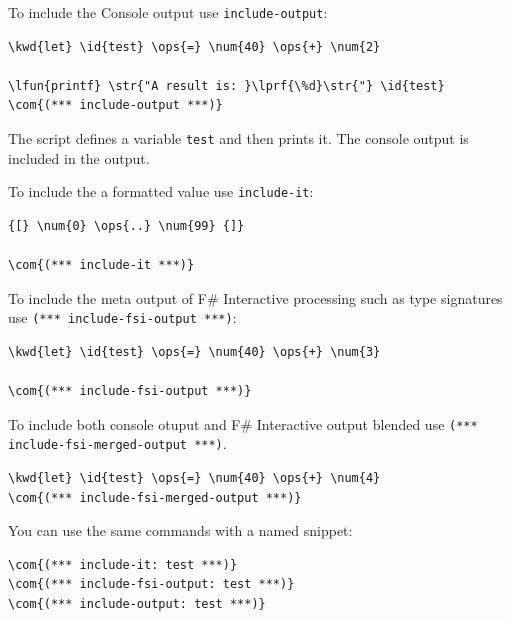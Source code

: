 \documentclass{article}
\newcommand{\id}[1]{\textcolor{black}{#1}}
\newcommand{\com}[1]{\textcolor{officegreen}{#1}}
\newcommand{\kwd}[1]{\textcolor{navy}{#1}}
\newcommand{\num}[1]{\textcolor{officegreen}{#1}}
\newcommand{\ops}[1]{\textcolor{purple}{#1}}
\newcommand{\str}[1]{\textcolor{olive}{#1}}
\begin{document}
To include the Console output use \texttt{include-output}:
\begin{Verbatim}[commandchars=\\\{\}]
\kwd{let} \id{test} \ops{=} \num{40} \ops{+} \num{2}

\lfun{printf} \str{"A result is: }\lprf{\%d}\str{"} \id{test}
\com{(*** include-output ***)}

\end{Verbatim}



The script defines a variable \texttt{test} and then prints it. The console output is included
in the output.


To include the a formatted value use \texttt{include-it}:
\begin{Verbatim}[commandchars=\\\{\}]
{[} \num{0} \ops{..} \num{99} {]}

\com{(*** include-it ***)}

\end{Verbatim}



To include the meta output of F\# Interactive processing such as type signatures use \texttt{(*** include-fsi-output ***)}:
\begin{Verbatim}[commandchars=\\\{\}]
\kwd{let} \id{test} \ops{=} \num{40} \ops{+} \num{3}

\com{(*** include-fsi-output ***)}

\end{Verbatim}



To include both console otuput and F\# Interactive output blended use \texttt{(*** include-fsi-merged-output ***)}.
\begin{Verbatim}[commandchars=\\\{\}]
\kwd{let} \id{test} \ops{=} \num{40} \ops{+} \num{4}
\com{(*** include-fsi-merged-output ***)}

\end{Verbatim}



You can use the same commands with a named snippet:
\begin{Verbatim}[commandchars=\\\{\}]
\com{(*** include-it: test ***)}
\com{(*** include-fsi-output: test ***)}
\com{(*** include-output: test ***)}

\end{Verbatim}
\end{document}
